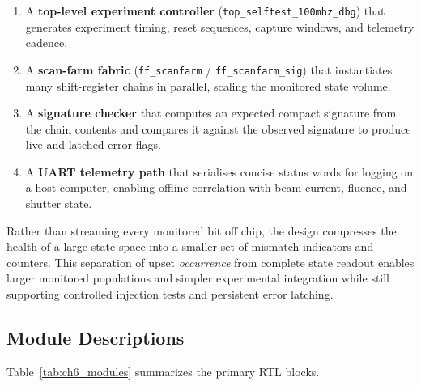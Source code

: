 \begin{enumerate}
    \item A \textbf{top-level experiment controller}
          (\texttt{top\_selftest\_100mhz\_dbg}) that generates experiment
          timing, reset sequences, capture windows, and telemetry cadence.

    \item A \textbf{scan-farm fabric} (\texttt{ff\_scanfarm} /
          \texttt{ff\_scanfarm\_sig}) that instantiates many shift-register
          chains in parallel, scaling the monitored state volume.

    \item A \textbf{signature checker} that computes an expected compact
          signature from the chain contents and compares it against the
          observed signature to produce live and latched error flags.

    \item A \textbf{UART telemetry path} that serialises concise status
          words for logging on a host computer, enabling offline
          correlation with beam current, fluence, and shutter state.
\end{enumerate}

Rather than streaming every monitored bit off chip, the design compresses
the health of a large state space into a smaller set of mismatch
indicators and counters.  This separation of upset \emph{occurrence}
from complete state readout enables larger monitored populations and
simpler experimental integration while still supporting controlled
injection tests and persistent error latching.

\subsection{Module Descriptions}
\label{subsec:ch6_modules}

Table~\ref{tab:ch6_modules} summarizes the primary RTL blocks.


